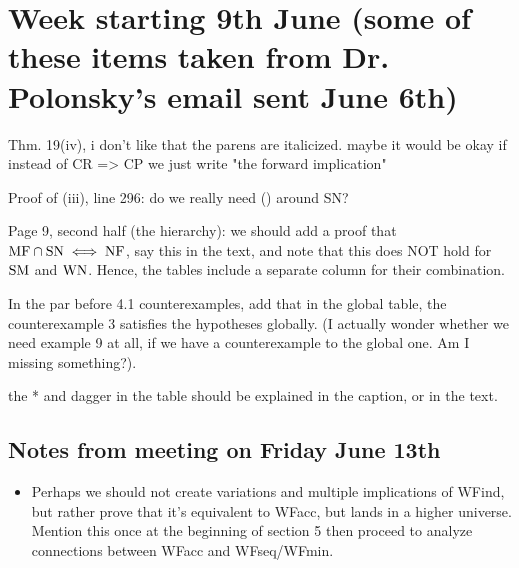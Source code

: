 \documentclass{article}
\newcommand{\cmark}{\ding{51}}%
\newcommand{\done}{\rlap{$\square$}{\raisebox{2pt}{\large\hspace{1pt}\cmark}}%
\hspace{-2.5pt}}
\begin{document}
\section*{Week starting 9th June (some of these items taken from Dr. Polonsky's email sent June 6th)}
\begin{todolist}
  \item [\done] Thm. 19(iv), i don't like that the parens are italicized.  maybe it would be okay if instead of CR => CP we just write "the forward implication"
  \item [\done] Proof of (iii), line 296: do we really need () around SN?
  \item Page 9, second half (the hierarchy): we should add a proof that $\mathrm{MF} \cap \mathrm{SN} \iff \mathrm{NF}$, say this in the text, and note that this does NOT hold for $\mathrm{SM}$ and $\mathrm{WN}$.  Hence, the tables include a separate column for their combination.
  \item  In the par before 4.1 counterexamples, add that in the global table, the counterexample 3 satisfies the hypotheses globally.
(I actually wonder whether we need example 9 at all, if we have a counterexample to the global one.  Am I missing something?). 
    \item [\done] the * and dagger in the table should be explained in the caption, or in the text.
\end{todolist}

\subsection*{Notes from meeting on Friday June 13th}

\begin{itemize}
  \item Perhaps we should not create variations and multiple implications of WFind,
  but rather prove that it's equivalent to WFacc, but lands in a higher universe.
  Mention this once at the beginning of section 5 then proceed to analyze
  connections between WFacc and WFseq/WFmin.
\end{itemize}
\end{document}

